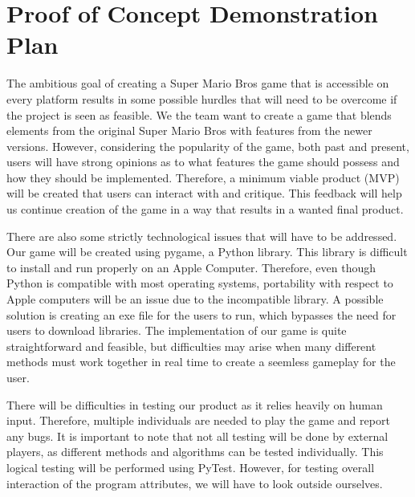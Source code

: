 \documentclass{article}
\begin{document}
\section{Proof of Concept Demonstration Plan}
%
%
%


The ambitious goal of creating a Super Mario Bros game that is accessible on
every platform results in some possible hurdles that will need to be overcome if
the project is seen as feasible. We the team want to create a game that blends
elements from the original Super Mario Bros with features from the newer
versions. However, considering the popularity of the game, both past and
present, users will have strong opinions as to what features the game should
possess and how they should be implemented. Therefore, a minimum viable product
(MVP) will be created that users can interact with and critique. This feedback
will help us continue creation of the game in a way that results in a wanted
final product.

There are also some strictly technological issues that will have to be
addressed. Our game will be created using pygame, a Python library. This library
is difficult to install and run properly on an Apple Computer. Therefore, even
though Python is compatible with most operating systems, portability with
respect to Apple computers will be an issue due to the incompatible library. A
possible solution is creating an exe file for the users to run, which bypasses
the need for users to download libraries. The implementation of our game is
quite straightforward and feasible, but difficulties may arise when many
different methods must work together in real time to create a seemless gameplay
for the user.

There will be difficulties in testing our product as it relies heavily on human
input. Therefore, multiple individuals are needed to play the game and report
any bugs. It is important to note that not all testing will be done by external
players, as different methods and algorithms can be tested individually. This
logical testing will be performed using PyTest. However, for testing overall
interaction of the program attributes, we will have to look outside ourselves.
\end{document}
